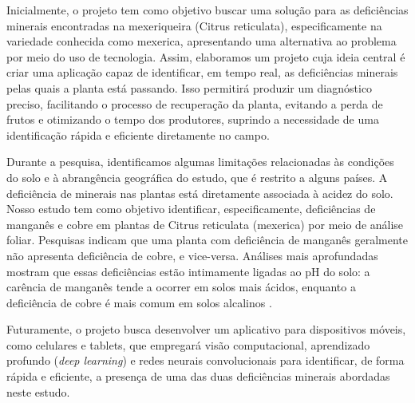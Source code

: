 Inicialmente, o projeto tem como objetivo buscar uma solução para as deficiências minerais encontradas na mexeriqueira (Citrus reticulata), especificamente na variedade conhecida como mexerica, apresentando uma alternativa ao problema por meio do uso de tecnologia. Assim, elaboramos um projeto cuja ideia central é criar uma aplicação capaz de identificar, em tempo real, as deficiências minerais pelas quais a planta está passando. Isso permitirá produzir um diagnóstico preciso, facilitando o processo de recuperação da planta, evitando a perda de frutos e otimizando o tempo dos produtores, suprindo a necessidade de uma identificação rápida e eficiente diretamente no campo.

Durante a pesquisa, identificamos algumas limitações relacionadas às condições do solo e à abrangência geográfica do estudo, que é restrito a alguns países. A deficiência de minerais nas plantas está diretamente associada à acidez do solo. Nosso estudo tem como objetivo identificar, especificamente, deficiências de manganês e cobre em plantas de Citrus reticulata (mexerica) por meio de análise foliar. Pesquisas indicam que uma planta com deficiência de manganês geralmente não apresenta deficiência de cobre, e vice-versa. Análises mais aprofundadas mostram que essas deficiências estão intimamente ligadas ao pH do solo: a carência de manganês tende a ocorrer em solos mais ácidos, enquanto a deficiência de cobre é mais comum em solos alcalinos \cite{ConclusãoMicroN, ConclusãoCobre}.

Futuramente, o projeto busca desenvolver um aplicativo para dispositivos móveis, como celulares e tablets, que empregará visão computacional, aprendizado profundo (\textit{deep learning}) e redes neurais convolucionais para identificar, de forma rápida e eficiente, a presença de uma das duas deficiências minerais abordadas neste estudo.